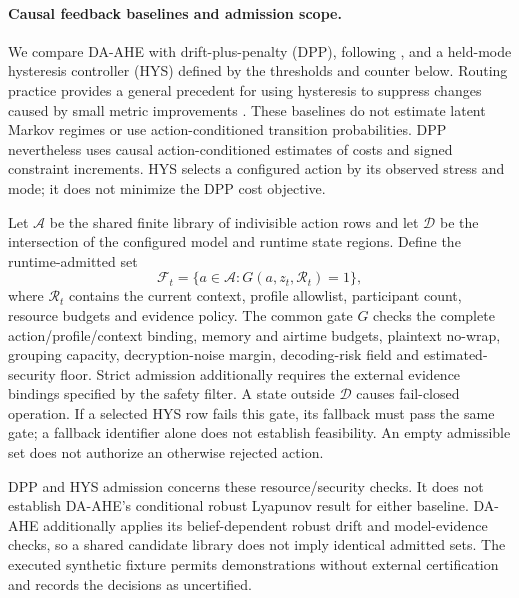 
\paragraph{Causal feedback baselines and admission scope.}
We compare DA-AHE with drift-plus-penalty (DPP), following
\cite{Neely2010Stochastic}, and a held-mode hysteresis controller (HYS)
defined by the thresholds and counter below. Routing practice provides a
general precedent for using hysteresis to suppress changes caused by small
metric improvements \cite{RFC6719}. These baselines do not estimate
latent Markov regimes or use action-conditioned transition probabilities.
DPP nevertheless uses causal action-conditioned estimates of costs and signed
constraint increments. HYS selects a configured action by its observed stress
and mode; it does not minimize the DPP cost objective.

Let $\mathcal{A}$ be the shared finite library of indivisible action rows and
let $\mathcal{D}$ be the intersection of the configured model and runtime
state regions. Define the runtime-admitted set
\begin{equation}
 \mathcal{F}_t=\{a\in\mathcal{A}:G(a,z_t,\mathcal{R}_t)=1\},
 \label{eq:baseline_runtime_set}
\end{equation}
where $\mathcal{R}_t$ contains the current context, profile allowlist, participant
count, resource budgets and evidence policy. The common gate $G$ checks the
complete action/profile/context binding, memory and airtime budgets, plaintext
no-wrap, grouping capacity, decryption-noise margin, decoding-risk field and
estimated-security floor. Strict admission additionally requires the external
evidence bindings specified by the safety filter. A state outside
$\mathcal{D}$ causes fail-closed operation. If a selected HYS row fails this
gate, its fallback must pass the same gate; a fallback identifier alone does
not establish feasibility. An empty admissible set does not authorize an
otherwise rejected action.

DPP and HYS admission concerns these resource/security checks. It does not
establish DA-AHE's conditional robust Lyapunov result for either baseline.
DA-AHE additionally applies its belief-dependent robust drift and model-evidence
checks, so a shared candidate library does not imply identical admitted sets.
The executed synthetic fixture permits demonstrations without external
certification and records the decisions as uncertified.

